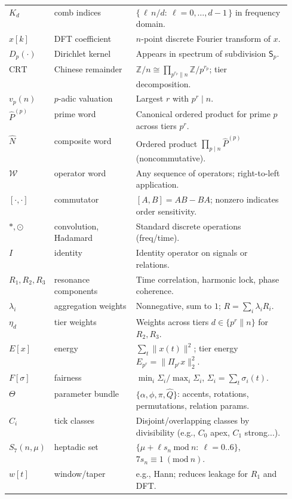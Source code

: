 \documentclass[12pt]{article}
\numberwithin{equation}{section}
\theoremstyle{plain}
\theoremstyle{definition}
\theoremstyle{remark}
\begin{document}
\begin{longtable}{@{}llp{0.55\linewidth}@{}}
$K_d$ & comb indices & $\{\,\ell\,n/d:\ \ell=0,\dots,d-1\,\}$ in frequency domain. \\
$\widehat{x}[k]$ & DFT coefficient & $n$-point discrete Fourier transform of $x$. \\
$D_p(\cdot)$ & Dirichlet kernel & Appears in spectrum of subdivision $\mathsf{S}_p$. \\
$\mathrm{CRT}$ & Chinese remainder & $\mathbb{Z}/n\cong\prod_{p^{r_p}\parallel n}\mathbb{Z}/p^{r_p}$; tier decomposition. \\
$v_p(n)$ & $p$-adic valuation & Largest $r$ with $p^r\mid n$. \\
$\hat{P}^{(p)}$ & prime word & Canonical ordered product for prime $p$ across tiers $p^r$. \\
$\widehat{N}$ & composite word & Ordered product $\prod_{p\mid n}\hat{P}^{(p)}$ (noncommutative). \\
$\mathcal{W}$ & operator word & Any sequence of operators; right-to-left application. \\
$[\cdot,\cdot]$ & commutator & $[A,B]=AB-BA$; nonzero indicates order sensitivity. \\
$\ast,\odot$ & convolution, Hadamard & Standard discrete operations (freq/time). \\
$I$ & identity & Identity operator on signals or relations. \\
$R_1,R_2,R_3$ & resonance components & Time correlation, harmonic lock, phase coherence. \\
$\lambda_i$ & aggregation weights & Nonnegative, sum to $1$; $R=\sum_i\lambda_i R_i$. \\
$\eta_d$ & tier weights & Weights across tiers $d\in\{p^r\parallel n\}$ for $R_2,R_3$. \\
$E[x]$ & energy & $\sum_t \|x(t)\|^2$; tier energy $E_{p^r}=\|\Pi_{p^r}x\|_2^2$. \\
$F[\sigma]$ & fairness & $\min_i \Sigma_i/\max_i \Sigma_i$, $\Sigma_i=\sum_t \sigma_i(t)$. \\
$\Theta$ & parameter bundle & $\{\alpha,\phi,\pi,\hat{Q}\}$: accents, rotations, permutations, relation params. \\
$C_i$ & tick classes & Disjoint/overlapping classes by divisibility (e.g., $C_0$ apex, $C_1$ strong...). \\
$S_7(n,\mu)$ & heptadic set & $\{\mu+\ell s_n\ \mathrm{mod}\ n:\ \ell=0..6\}$, $7s_n\equiv 1\ (\mathrm{mod}\ n)$. \\
$w[t]$ & window/taper & e.g., Hann; reduces leakage for $R_1$ and DFT. \\

\end{longtable}
\end{document}
